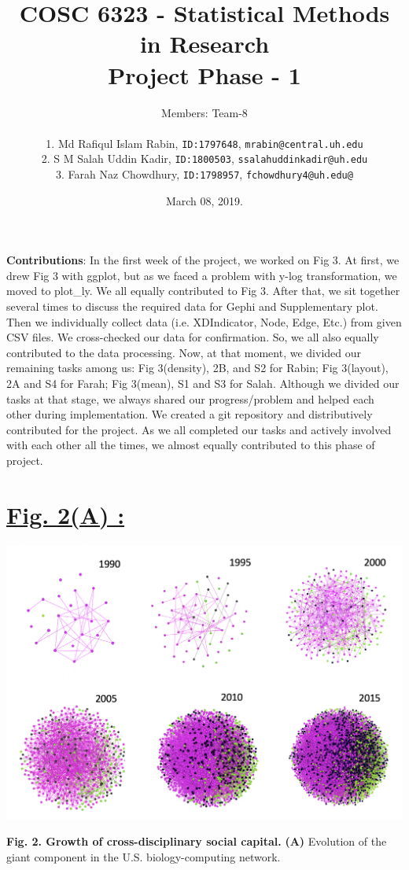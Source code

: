 \documentclass{article}\usepackage[]{graphicx}\usepackage[]{color}
\title{COSC 6323 - Statistical Methods in Research\\Project Phase - 1\\}
\author{%
    Members: Team-8 \\\\
    1. Md Rafiqul Islam Rabin, \texttt{ID:1797648}, \texttt{mrabin@central.uh.edu}\vspace{2pt} \\
    2. S M Salah Uddin Kadir, \texttt{ID:1800503}, \texttt{ssalahuddinkadir@uh.edu}\vspace{2pt} \\
    3. Farah Naz Chowdhury, \texttt  {ID:1798957}, \texttt{fchowdhury4@uh.edu@}\vspace{2pt} \\
}
\date{March 08, 2019.}
\begin{document}
\maketitle
\par{\textbf{Contributions}: In the first week of the project, we worked on Fig 3. At first, we drew Fig 3 with ggplot, but as we faced a problem with y-log transformation, we moved to plot\_ly. We all equally contributed to Fig 3. After that, we sit together several times to discuss the required data for Gephi and Supplementary plot. Then we individually collect data (i.e. XDIndicator, Node, Edge, Etc.) from given CSV files. We cross-checked our data for confirmation. So, we all also equally contributed to the data processing. Now, at that moment, we divided our remaining tasks among us: Fig 3(density), 2B, and S2 for Rabin; Fig 3(layout), 2A and S4 for Farah; Fig 3(mean), S1 and S3 for Salah. Although we divided our tasks at that stage, we always shared our progress/problem and helped each other during implementation. We created a git repository and distributively contributed for the project. As we all completed our tasks and actively involved with each other all the times, we almost equally contributed to this phase of project.}

\newpage
\section*{\underline{Fig. 2(A) :}}
\begin{center}
\includegraphics[scale=0.6]{2A.png}
\newline
\par{\textbf{Fig. 2. Growth of cross-disciplinary social capital.} 
\textbf{(A)} Evolution of the giant component in the U.S. biology-computing network.}
\end{center}
\end{document}
